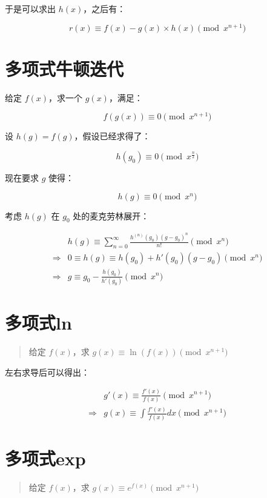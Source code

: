 \documentclass[UTF8]{article}
\begin{document}
于是可以求出 $h(x)$，之后有：

$$
r(x) \equiv f(x)-g(x) \times h(x) \pmod {x^{n+1}}
$$

\section{多项式牛顿迭代}

    给定 $f(x)$，求一个 $g(x)$，满足：
    
    $$
    f(g(x)) \equiv 0 \pmod {x^{n+1}}
    $$

设 $h(g)=f(g)$，假设已经求得了：

$$
h(g_0) \equiv 0 \pmod {x^{\frac{n}{2}}}
$$

现在要求 $g$ 使得：

$$
h(g) \equiv 0 \pmod {x^{n}}
$$

考虑 $h(g)$ 在 $g_0$ 处的麦克劳林展开：

$$
\begin{aligned}
&h(g) \equiv \sum_{n = 0}^{\infty} \frac{h^{(n)}(g_0)(g-g_0)^n}{n!} \pmod {x^{n}} \\
\Rightarrow
&0 \equiv h(g) \equiv h(g_0)+h'(g_0)(g-g_0) \pmod {x^{n}} \\
\Rightarrow
&g \equiv g_0-\frac{h(g_0)}{h'(g_0)} \pmod {x^{n}}
\end{aligned}
$$

\section{多项式ln}

\begin{quotation}
    给定 $f(x)$，求 $g(x) \equiv \ln(f(x)) \pmod {x^{n+1}}$
\end{quotation}

左右求导后可以得出：

$$
\begin{aligned}
& g'(x) \equiv \frac{f'(x)}{f(x)} \pmod {x^{n+1}} \\
\Rightarrow 
& g(x) \equiv \int \frac{f'(x)}{f(x)}dx \pmod {x^{n+1}}
\end{aligned}
$$

\section{多项式exp}

\begin{quotation}
    给定 $f(x)$，求 $g(x) \equiv e^{f(x)} \pmod {x^{n+1}}$
\end{quotation}
\end{document}

